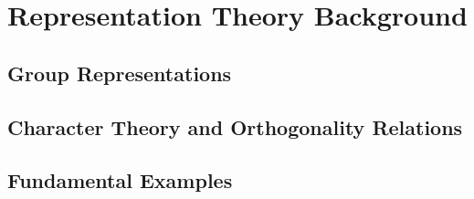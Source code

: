 \documentclass[../main.tex]{subfiles}
\begin{document}
\section{Representation Theory Background}

\subsection{Group Representations}

\subsection{Character Theory and Orthogonality Relations}

\subsection{Fundamental Examples}
\end{document}
